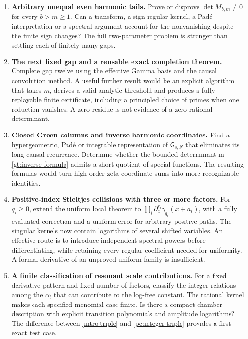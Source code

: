 \documentclass[11pt,a4paper]{article}
\theoremstyle{definition}
\theoremstyle{remark}
\numberwithin{equation}{section}
\begin{document}
\begin{enumerate}[label=\textbf{Q\arabic*.},leftmargin=*]
\item \textbf{Arbitrary unequal even harmonic tails.}
Prove or disprove $\det M_{b,m}\ne0$ for every $b>m\ge1$.
Can a transform, a sign-regular kernel, a Pad\'e interpretation or a
spectral argument account for the nonvanishing despite the finite
sign changes? The full two-parameter problem is stronger than
settling each of finitely many gaps.

\item \textbf{The next fixed gap and a reusable exact completion theorem.}
Complete gap twelve using the effective Gamma basis and the causal
convolution method. A useful further result would be an explicit
algorithm that takes $m$, derives a valid analytic threshold and
produces a fully replayable finite certificate, including a principled
choice of primes when one reduction vanishes. A zero residue is not
evidence of a zero rational determinant.

\item \textbf{Closed Green columns and inverse harmonic coordinates.}
Find a hypergeometric, Pad\'e or integrable representation of
$\mathsf G_{s,N}$ that eliminates its long causal recurrence.
Determine whether the bounded determinant in
\eqref{gt:inverse-formula} admits a short quotient of special functions.
The resulting formulas would turn high-order zeta-coordinate sums
into more recognizable identities.

\item \textbf{Positive-index Stieltjes collisions with three or more factors.}
For $q_i\ge0$, extend the uniform local theorem to
$\prod_i\partial_x^{r_i}\gamma_{q_i}(x+a_i)$, with a fully evaluated
correction and a uniform error for arbitrary positive paths.
The singular kernels now contain logarithms of several shifted
variables. An effective route is to introduce independent spectral
powers before differentiating, while retaining every regular
coefficient needed for uniformity. A formal derivative of an
unproved uniform family is insufficient.

\item \textbf{A finite classification of resonant scale contributions.}
For a fixed derivative pattern and fixed number of factors, classify
the integer relations among the $\alpha_i$ that can contribute to
the log-free constant. The rational kernel makes each specified
monomial case finite. Is there a compact chamber description with
explicit transition polynomials and amplitude logarithms?
The difference between \eqref{intro:triple} and
\eqref{pc:integer-triple} provides a first exact test case.


\end{enumerate}
\end{document}
